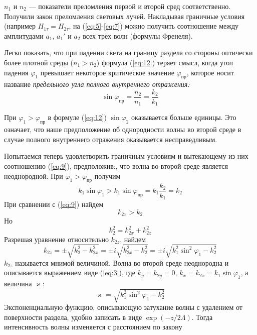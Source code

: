 \documentclass[a4paper, 12pt]{article}
\begin{document}
	$n_1$ и $n_2$ — показатели преломления первой и второй сред соответственно. Получили закон преломления световых лучей. Накладывая граничные условия (например $H_{1\tau}=H_{2\tau}$, на (\ref{eq:5}-\ref{eq:7}) можно получить соотношение между амплитудами $a_1$, $a_1'$ и $a_2$ всех трёх волн (формулы Френеля).\par
	Легко показать, что при падении света на границу раздела со стороны оптически более плотной среды ($n_1>n_2$) формула (\ref{eq:12}) теряет смысл, когда угол падения $\varphi_1$ превышает некоторое критическое значение $\varphi_\text{пр}$, которое носит название \textit{предельного угла полного внутреннего отражения:}
	\begin{equation}
		\sin\varphi_\text{пр}=\frac{n_2}{n_1}=\frac{k_2}{k_1}
	\end{equation}
	\par
	При $\varphi_1>\varphi_\text{пр}$ в формуле (\ref{eq:12}) $\sin\varphi_2$ оказывается больше единицы. Это означает, что наше предположение об однородности волны во второй среде в случае полного внутреннего отражения оказывается несправедливым.\par
	Попытаемся теперь удовлетворить граничным условиям и вытекающему из них соотношению (\ref{eq:9}), предположив:, что волна во второй среде является неоднородной. При $\varphi_1>\varphi_\text{пр}$ получим
	\begin{equation}
		k_1\sin\varphi_1>k_1\sin\varphi_\text{пр}=k_1\frac{k_2}{k_1}=k_2
	\end{equation}
	При сравнении с (\ref{eq:9}) найдем
	\begin{equation}
		k_{2x}>k_2
	\end{equation}
	Но
	\begin{equation}
		k_2^2=k_{2x}^2+k_{2z}^2
	\end{equation}
	Разрешая уравнение относительно $k_{2z}$, найдем
	\begin{equation}
		k_{2z}=\pm\sqrt{k_2^2-k_{2x}^2}=\pm i \sqrt{k_{2x}^2-k_2^2}=\pm i\sqrt{k_1^2\sin^2\varphi_1-k_2^2}
	\end{equation}
	$k_{2z}$ называется мнимой величиной. Волна во второй среде неоднородна и описывается выражением виде (\ref{eq:3}), где $k_y=k_{2y}=0$, $k_x=k_{2x}=k_1\sin\varphi_1$, а величина $\varkappa$:
	\begin{equation}
		\varkappa=\sqrt{k_1^2\sin^2\varphi_1-k_2^2}
	\end{equation}
	Экспоненциальную функцию, описывающую затухание волны с удалением от поверхности раздела, удобно записать в виде $\exp\left(-z/2\Lambda\right)$. Тогда интенсивность волны изменяется с расстоянием по закону
\end{document}
